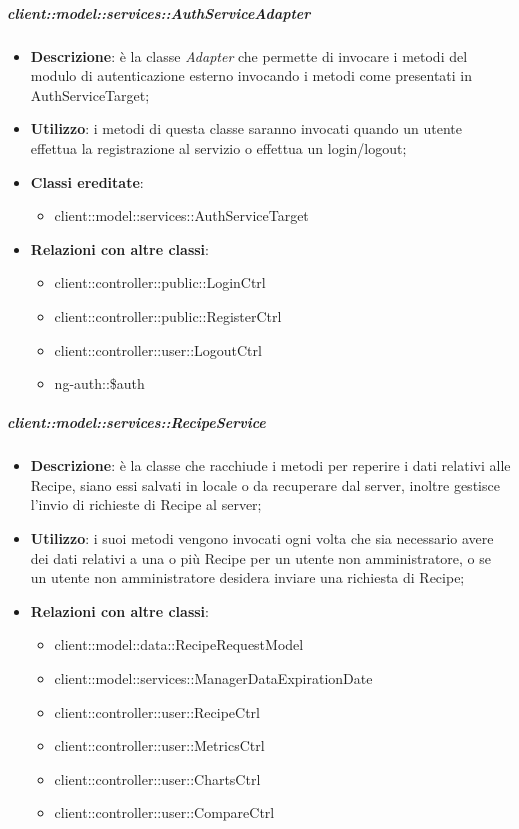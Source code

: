 		\subparagraph{client::model::services::AuthServiceAdapter} %
		\label{subp:client_model_services_authservice}
			\begin{itemize}
				\item \textbf{Descrizione}: è la classe \emph{Adapter} che permette di invocare i metodi del modulo di autenticazione esterno invocando i metodi come presentati in AuthServiceTarget;
				\item \textbf{Utilizzo}:  i metodi di questa classe saranno invocati quando un utente effettua la registrazione al servizio o effettua un login/logout;
				\item \textbf{Classi ereditate}:
					\begin{itemize}
						\item client::model::services::AuthServiceTarget
					\end{itemize}
				\item \textbf{Relazioni con altre classi}:
					\begin{itemize}
						\item client::controller::public::LoginCtrl
						\item client::controller::public::RegisterCtrl
						\item client::controller::user::LogoutCtrl
						\item ng-auth::\$auth
					\end{itemize}
			\end{itemize}


		\subparagraph{client::model::services::RecipeService} %
		\label{subp:client_model_services_recipeservice}
			\begin{itemize}
				\item \textbf{Descrizione}: è la classe che racchiude i metodi per reperire i dati relativi alle Recipe, siano essi salvati in locale o da recuperare dal server, inoltre gestisce l'invio di richieste di Recipe al server;
				\item \textbf{Utilizzo}: i suoi metodi vengono invocati ogni volta che sia necessario avere dei dati relativi a una o più Recipe per un utente non amministratore, o se un utente non amministratore desidera inviare una richiesta di Recipe;
				\item \textbf{Relazioni con altre classi}:
					\begin{itemize}
						\item client::model::data::RecipeRequestModel
						\item client::model::services::ManagerDataExpirationDate
						\item client::controller::user::RecipeCtrl
						\item client::controller::user::MetricsCtrl
						\item client::controller::user::ChartsCtrl
						\item client::controller::user::CompareCtrl
					\end{itemize}
			\end{itemize}

